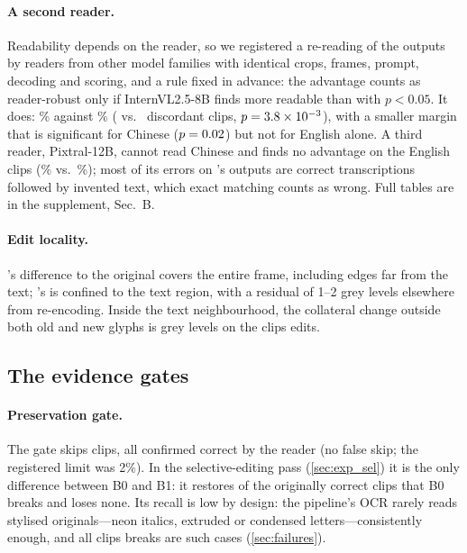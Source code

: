 \paragraph{A second reader.} Readability depends on the reader, so we registered a re-reading of the outputs by readers from other model families with identical crops, frames, prompt, decoding and scoring, and a rule fixed in advance: the advantage counts as reader-robust only if InternVL2.5-8B finds \method more readable than \steer with $p<0.05$. It does: \jIvlOurs\% against \jIvlSteer\% (\jIvlOnlyOurs{} vs.\ \jIvlOnlySteer{} discordant clips, $p=3.8\times10^{-3}$), with a smaller margin that is significant for Chinese ($p=0.02$) but not for English alone. A third reader, Pixtral-12B, cannot read Chinese and finds no advantage on the English clips (\jPixOurs\% vs.\ \jPixSteer\%); most of its errors on \method's outputs are correct transcriptions followed by invented text, which exact matching counts as wrong. Full tables are in the supplement, Sec.~B.

\paragraph{Edit locality.} \steer's difference to the original covers the entire frame, including edges far from the text; \method's is confined to the text region, with a residual of 1--2 grey levels elsewhere from re-encoding. Inside the text neighbourhood, the collateral change outside both old and new glyphs is \rOursCollat{} grey levels on the \rOursCollatN{} clips \method edits.



\subsection{The evidence gates}
\label{sec:exp_gates}
\paragraph{Preservation gate.} The gate skips \rSkipped{} clips, all confirmed correct by the reader (no false skip; the registered limit was 2\%). In the selective-editing pass (\cref{sec:exp_sel}) it is the only difference between B0 and B1: it restores \sRestored{} of the \sBrokenBzero{} originally correct clips that B0 breaks and loses none. Its recall is low by design: the pipeline's OCR rarely reads stylised originals---neon italics, extruded or condensed letters---consistently enough, and all \rOursBroken{} clips \method breaks are such cases (\cref{sec:failures}).


